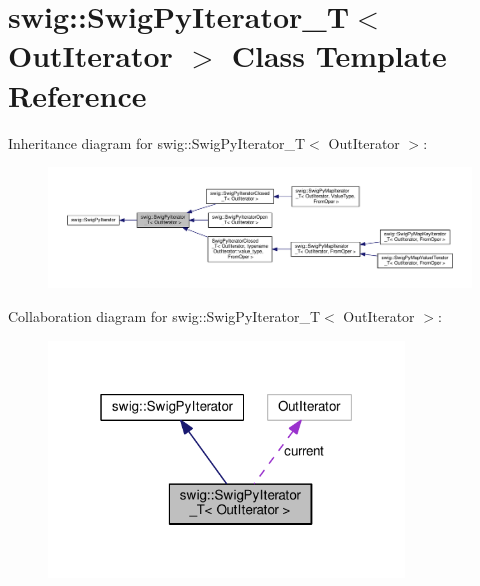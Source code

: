 \hypertarget{classswig_1_1SwigPyIterator__T}{}\section{swig\+:\+:Swig\+Py\+Iterator\+\_\+T$<$ Out\+Iterator $>$ Class Template Reference}
\label{classswig_1_1SwigPyIterator__T}


Inheritance diagram for swig\+:\+:Swig\+Py\+Iterator\+\_\+T$<$ Out\+Iterator $>$\+:\nopagebreak
\begin{figure}[H]
\begin{center}
\leavevmode
\includegraphics[width=350pt]{classswig_1_1SwigPyIterator__T__inherit__graph}
\end{center}
\end{figure}


Collaboration diagram for swig\+:\+:Swig\+Py\+Iterator\+\_\+T$<$ Out\+Iterator $>$\+:\nopagebreak
\begin{figure}[H]
\begin{center}
\leavevmode
\includegraphics[width=268pt]{classswig_1_1SwigPyIterator__T__coll__graph}
\end{center}
\end{figure}
